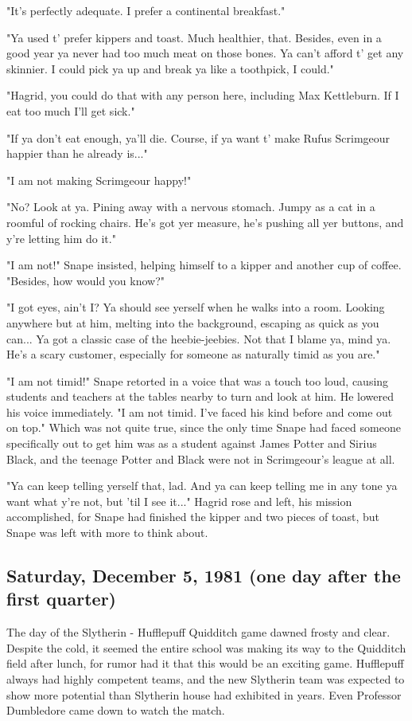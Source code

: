 "It's perfectly adequate. I prefer a continental breakfast."

"Ya used t' prefer kippers and toast. Much healthier, that. Besides, even in a good year ya never had too much meat on those bones. Ya can't afford t' get any skinnier. I could pick ya up and break ya like a toothpick, I could."

"Hagrid, you could do that with any person here, including Max Kettleburn. If I eat too much I'll get sick."

"If ya don't eat enough, ya'll die. Course, if ya want t' make Rufus Scrimgeour happier than he already is..."

"I am not making Scrimgeour happy!"

"No? Look at ya. Pining away with a nervous stomach. Jumpy as a cat in a roomful of rocking chairs. He's got yer measure, he's pushing all yer buttons, and y're letting him do it."

"I am not!" Snape insisted, helping himself to a kipper and another cup of coffee. "Besides, how would you know?"

"I got eyes, ain't I? Ya should see yerself when he walks into a room. Looking anywhere but at him, melting into the background, escaping as quick as you can... Ya got a classic case of the heebie-jeebies. Not that I blame ya, mind ya. He's a scary customer, especially for someone as naturally timid as you are."

"I am not timid!" Snape retorted in a voice that was a touch too loud, causing students and teachers at the tables nearby to turn and look at him. He lowered his voice immediately. "I am not timid. I've faced his kind before and come out on top." Which was not quite true, since the only time Snape had faced someone specifically out to get him was as a student against James Potter and Sirius Black, and the teenage Potter and Black were not in Scrimgeour's league at all.

"Ya can keep telling yerself that, lad. And ya can keep telling me in any tone ya want what y're not, but 'til I see it..." Hagrid rose and left, his mission accomplished, for Snape had finished the kipper and two pieces of toast, but Snape was left with more to think about.

\subsection{Saturday, December 5, 1981 (one day after the first quarter)}

The day of the Slytherin - Hufflepuff Quidditch game dawned frosty and clear. Despite the cold, it seemed the entire school was making its way to the Quidditch field after lunch, for rumor had it that this would be an exciting game. Hufflepuff always had highly competent teams, and the new Slytherin team was expected to show more potential than Slytherin house had exhibited in years. Even Professor Dumbledore came down to watch the match.

